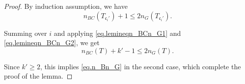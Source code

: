 \begin{proof}
By induction assumption, we have
\begin{equation}
    n_{BC}(T_{\mathfrak{c}_i'}) + 1 \le 2n_{G}(T_{\mathfrak{c}_i'}).
\end{equation}

Summing over $i$ and applying \eqref{eq.lemineqn_BCn_G1} and \eqref{eq.lemineqn_BCn_G2}, we get 
\begin{equation}
    n_{BC}(T) + k' - 1 \le 2n_{G}(T).
\end{equation}

Since $k'\ge 2$, this implies \eqref{eq.n_Bn_G} in the second case, which complete the proof of the lemma.
\end{proof}






